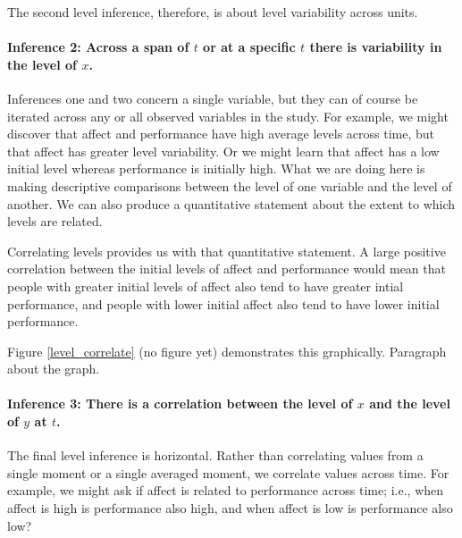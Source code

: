 \documentclass[english,,man]{apa6}
\let\oldparagraph\paragraph
\renewcommand{\paragraph}[1]{\oldparagraph{#1}\mbox{}}
\theoremstyle{definition}
\theoremstyle{definition}
\theoremstyle{definition}
\theoremstyle{remark}
\begin{document}
\noindent The second level inference, therefore, is about level
variability across units.

\hypertarget{inference-2-across-a-span-of-t-or-at-a-specific-t-there-is-variability-in-the-level-of-x.}{%
\paragraph{\texorpdfstring{Inference 2: Across a span of \(t\) or at a
specific \(t\) there is variability in the level of
\(x\).}{Inference 2: Across a span of t or at a specific t there is variability in the level of x.}}\label{inference-2-across-a-span-of-t-or-at-a-specific-t-there-is-variability-in-the-level-of-x.}}

Inferences one and two concern a single variable, but they can of course
be iterated across any or all observed variables in the study. For
example, we might discover that affect and performance have high average
levels across time, but that affect has greater level variability. Or we
might learn that affect has a low initial level whereas performance is
initially high. What we are doing here is making descriptive comparisons
between the level of one variable and the level of another. We can also
produce a quantitative statement about the extent to which levels are
related.

Correlating levels provides us with that quantitative statement. A large
positive correlation between the initial levels of affect and
performance would mean that people with greater initial levels of affect
also tend to have greater intial performance, and people with lower
initial affect also tend to have lower initial performance.

Figure \ref{level_correlate} (no figure yet) demonstrates this
graphically. Paragraph about the graph.

\hypertarget{inference-3-there-is-a-correlation-between-the-level-of-x-and-the-level-of-y-at-t.}{%
\paragraph{\texorpdfstring{Inference 3: There is a correlation between
the level of \(x\) and the level of \(y\) at
\(t\).}{Inference 3: There is a correlation between the level of x and the level of y at t.}}\label{inference-3-there-is-a-correlation-between-the-level-of-x-and-the-level-of-y-at-t.}}

The final level inference is horizontal. Rather than correlating values
from a single moment or a single averaged moment, we correlate values
across time. For example, we might ask if affect is related to
performance across time; i.e., when affect is high is performance also
high, and when affect is low is performance also low?
\end{document}
